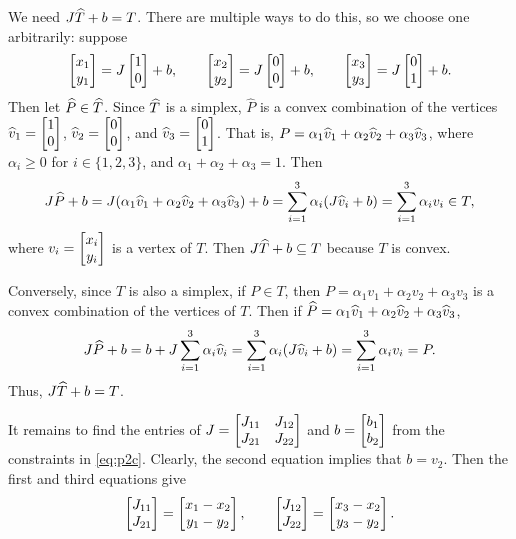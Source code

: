 \documentclass{homework}
\begin{document}
\begin{alphaparts}
		\questionpart We need $J\widehat{T} + b = T$. There are multiple ways to do this, so we choose one arbitrarily: suppose
		\begin{equation}
			\label{eq:p2c}
			\left[\begin{matrix}x_1 \\ y_1\end{matrix}\right] = J\left[\begin{matrix}1 \\ 0\end{matrix}\right] + b, \qquad \left[\begin{matrix}x_2 \\ y_2\end{matrix}\right] = J\left[\begin{matrix}0 \\ 0\end{matrix}\right] + b, \qquad \left[\begin{matrix}x_3 \\ y_3\end{matrix}\right] = J\left[\begin{matrix}0 \\ 1\end{matrix}\right] + b.
		\end{equation}
		Then let $\widehat{P} \in \widehat{T}$. Since $\widehat{T}$ is a simplex, $\widehat{P}$ is a convex combination of the vertices $\widehat{v}_1=\left[\begin{matrix}1 \\ 0\end{matrix}\right]$, $\widehat{v}_2=\left[\begin{matrix}0 \\ 0\end{matrix}\right]$, and $\widehat{v}_3=\left[\begin{matrix}0 \\ 1\end{matrix}\right]$. That is, $P = \alpha_1\widehat{v}_1 + \alpha_2\widehat{v}_2 + \alpha_3\widehat{v}_3$, where $\alpha_i \ge 0$ for $i \in \{1,2,3\}$, and $\alpha_1+\alpha_2+\alpha_3 = 1$. Then
		\begin{equation*}
			J\widehat{P}+b = J(\alpha_1\widehat{v}_1 + \alpha_2\widehat{v}_2 + \alpha_3\widehat{v}_3) + b = \sum_{i=1}^3\alpha_i(J\widehat{v}_i + b) = \sum_{i=1}^3\alpha_iv_i \in T,
		\end{equation*}
		where $v_i = \left[\begin{matrix}x_i \\ y_i\end{matrix}\right]$ is a vertex of $T$. Then $J\widehat{T} + b \subseteq T$ because $T$ is convex. 
		
		Conversely, since $T$ is also a simplex, if $P \in T$, then $P = \alpha_1v_1 + \alpha_2v_2 + \alpha_3v_3$ is a convex combination of the vertices of $T$. Then if $\widehat{P} = \alpha_1\widehat{v}_1 + \alpha_2\widehat{v}_2 + \alpha_3\widehat{v}_3$,
		\begin{equation*}
			J\widehat{P} + b = b + J\sum_{i=1}^3\alpha_i\widehat{v}_i = \sum_{i=1}^3\alpha_i(J\widehat{v}_i + b) = \sum_{i=1}^3\alpha_iv_i = P.
		\end{equation*}
		Thus, $J\widehat{T} +b = T$.
		
		It remains to find the entries of $J = \left[\begin{matrix}J_{11} & J_{12} \\ J_{21} & J_{22}\end{matrix}\right]$ and $b = \left[\begin{matrix}b_1 \\ b_2\end{matrix}\right]$ from the constraints in \eqref{eq:p2c}. Clearly, the second equation implies that $b = v_2$. Then the first and third equations give
		\begin{equation*}
			\left[\begin{matrix}J_{11} \\ J_{21}\end{matrix}\right] = \left[\begin{matrix}x_1 - x_2 \\ y_1-y_2\end{matrix}\right], \qquad \left[\begin{matrix}J_{12} \\ J_{22}\end{matrix}\right] = \left[\begin{matrix}x_3 - x_2 \\ y_3 - y_2\end{matrix}\right].
		\end{equation*}
		

\end{alphaparts}
\end{document}
